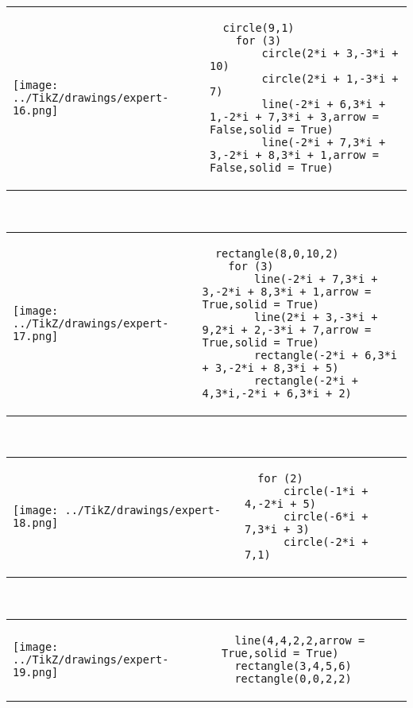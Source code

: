             \begin{tabular}{ll}
    \texttt{[image: ../TikZ/drawings/expert-16.png]}&
    
        \begin{minipage}{10cm}
        \begin{verbatim}
  circle(9,1)
    for (3)
        circle(2*i + 3,-3*i + 10)
        circle(2*i + 1,-3*i + 7)
        line(-2*i + 6,3*i + 1,-2*i + 7,3*i + 3,arrow = False,solid = True)
        line(-2*i + 7,3*i + 3,-2*i + 8,3*i + 1,arrow = False,solid = True)
        \end{verbatim}
\end{minipage}

    \end{tabular}        
            \\

            \begin{tabular}{ll}
    \texttt{[image: ../TikZ/drawings/expert-17.png]}&
    
        \begin{minipage}{10cm}
        \begin{verbatim}
  rectangle(8,0,10,2)
    for (3)
        line(-2*i + 7,3*i + 3,-2*i + 8,3*i + 1,arrow = True,solid = True)
        line(2*i + 3,-3*i + 9,2*i + 2,-3*i + 7,arrow = True,solid = True)
        rectangle(-2*i + 6,3*i + 3,-2*i + 8,3*i + 5)
        rectangle(-2*i + 4,3*i,-2*i + 6,3*i + 2)
        \end{verbatim}
\end{minipage}

    \end{tabular}        
            \\

            \begin{tabular}{ll}
    \texttt{[image: ../TikZ/drawings/expert-18.png]}&
    
        \begin{minipage}{10cm}
        \begin{verbatim}
  for (2)
      circle(-1*i + 4,-2*i + 5)
      circle(-6*i + 7,3*i + 3)
      circle(-2*i + 7,1)
        \end{verbatim}
\end{minipage}

    \end{tabular}        
            \\

            \begin{tabular}{ll}
    \texttt{[image: ../TikZ/drawings/expert-19.png]}&
    
        \begin{minipage}{10cm}
        \begin{verbatim}
  line(4,4,2,2,arrow = True,solid = True)
  rectangle(3,4,5,6)
  rectangle(0,0,2,2)
        \end{verbatim}
\end{minipage}

    \end{tabular}        
            \\

